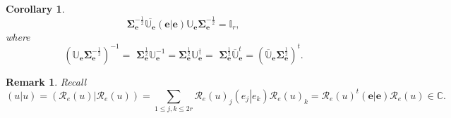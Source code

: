 \documentclass[aps,preprint]{revtex4}%
\newtheorem{corollary}[theorem]{Corollary}
\newtheorem{remark}[theorem]{Remark}
\begin{document}
\begin{corollary}%
\begin{equation}
\mathbf{\Sigma}_{\mathbf{e}}^{-\frac{1}{2}}\overline{\mathbb{U}_{\mathbf{e}}%
}\left(  \left.  \mathbf{e}\right\vert \mathbf{e}\right)  \mathbb{U}%
_{\mathbf{e}}\mathbf{\Sigma}_{\mathbf{e}}^{-\frac{1}{2}}=\mathbb{I}_{r},
\end{equation}
where
\begin{equation}
\left(  \mathbb{U}_{\mathbf{e}}\mathbf{\Sigma}_{\mathbf{e}}^{-\frac{1}{2}%
}\right)  ^{-1}=\,\,\mathbf{\Sigma}_{\mathbf{e}}^{\frac{1}{2}}\mathbb{U}%
_{\mathbf{e}}^{-1}=\mathbf{\Sigma}_{\mathbf{e}}^{\frac{1}{2}}\mathbb{U}%
_{\mathbf{e}}^{\dagger}=\,\,\mathbf{\Sigma}_{\mathbf{e}}^{\frac{1}{2}%
}\overline{\mathbb{U}}_{\mathbf{e}}^{t}=\left(  \overline{\mathbb{U}%
}_{\mathbf{e}}\mathbf{\Sigma}_{\mathbf{e}}^{\frac{1}{2}}\right)  ^{t}.
\end{equation}

\end{corollary}

\begin{remark}
Recall%
\begin{equation}
\left(  \left.  u\right\vert u\right)  =\left(  \left.  \mathcal{R}_{e}\left(
u\right)  \right\vert \mathcal{R}_{e}\left(  u\right)  \right)  =\sum_{1\leq
j,k\leq2r}\mathcal{R}_{e}\left(  u\right)  _{j}\left(  \left.  e_{j}%
\right\vert e_{k}\right)  \mathcal{R}_{e}\left(  u\right)  _{k}=\mathcal{R}%
_{e}\left(  u\right)  ^{t}\left(  \left.  \mathbf{e}\right\vert \mathbf{e}%
\right)  \mathcal{R}_{e}\left(  u\right)  \in\mathbb{C}.
\end{equation}

\end{remark}
\end{document}
